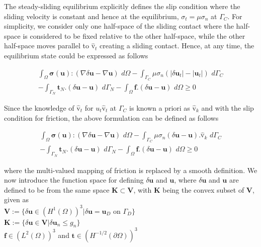 The steady-sliding equilibrium explicitly defines the slip condition where the sliding velocity is constant and hence at the equilibrium, $\sigma_t = \mu\sigma_n $ at $\Gamma_C$. 
For simplicity, we consider only one half-space of the sliding contact where the half-space is considered to be fixed relative to the other half-space, while the other half-space moves parallel to $\bm{\hat{\mathrm v}}_t$ creating a sliding contact.
Hence, at any time, the equilibrium state could be expressed as follows

\begin{multline}
\int_{\Omega}  \bm{\sigma}(\bm{u}):(\nabla \delta \bm{u}-\nabla \bm{{u}}) \,\,d\Omega - \int_{\Gamma_C} \mu\sigma_n(|\delta{\bm{u}}_t|-|{{\bm{u}}}_t|) \,\, d\Gamma_C\\
  -  \int_{\Gamma_N} \bm{t}_N.(\delta \bm{u}-\bm{{u}}) \,\, d\Gamma_N- \int_{\Omega} \bm{f}.(\delta \bm{u}-\bm{{u}}) \,\, d\Omega \geq 0
\end{multline}

Since the knowledge of $\bm{\hat{\mathrm v}}_t$ for ${u}_t\bm{\hat{\mathrm v}}_t$ at $\Gamma_C$ is known a priori as $\bm{\hat{\mathrm v}}_k$ and with the slip condition for friction, the above formulation can be defined as follows

\begin{multline}\label{pre_normcomp}
\int_{\Omega}  \bm{\sigma}(\bm{u}):(\nabla \delta \bm{u}-\nabla \bm{{u}}) \,\,d\Omega - \int_{\Gamma_C} \mu\sigma_n(\delta \bm{u}-\bm{{u}}).\bm{\hat{\mathrm v}}_k \,\, d\Gamma_C\\
  -  \int_{\Gamma_N} \bm{t}_N.(\delta \bm{u}-\bm{{u}}) \,\, d\Gamma_N- \int_{\Omega} \bm{f}.(\delta \bm{u}-\bm{{u}}) \,\, d\Omega \geq 0
\end{multline}

where the multi-valued mapping of friction is replaced by a smooth definition. We now introduce the function space for defining $\delta \bm{u}$ and $\bm{{u}}$, where $\delta \bm{u}$ and $\bm{{u}}$ are defined to be from the same space $\bm K\subset \bm V $, with $\bm K$ being the convex subset of $\bm V$, given as\\

\qquad$\bm V:= \{ \delta \bm{u} \in (H^1(\Omega))^3 | \delta \bm{u}=\bm{u}_D\,\, \mathrm{on} \,\, \Gamma_D\}$\\

\qquad $\bm K:=\{\delta \bm{u} \in \bm V | \delta \bm{u}_n \leq g_n\}$\\

\qquad $\bm{f}\in (L^2(\Omega))^3$ and $\bm{t} \in (H^{-1/2}(\partial\Omega))^3$\\

